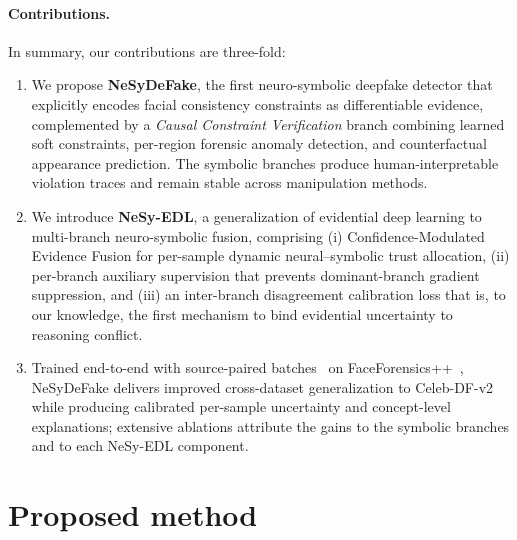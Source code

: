 \documentclass{article}
\begin{document}
\paragraph{Contributions.}
In summary, our contributions are three-fold:
\begin{enumerate}
  \item We propose \textbf{NeSyDeFake}, the first neuro-symbolic deepfake detector that explicitly encodes facial consistency constraints as differentiable evidence, complemented by a \emph{Causal Constraint Verification} branch combining learned soft constraints, per-region forensic anomaly detection, and counterfactual appearance prediction. The symbolic branches produce human-interpretable violation traces and remain stable across manipulation methods.
  \item We introduce \textbf{NeSy-EDL}, a generalization of evidential deep learning to multi-branch neuro-symbolic fusion, comprising (i) Confidence-Modulated Evidence Fusion for per-sample dynamic neural--symbolic trust allocation, (ii) per-branch auxiliary supervision that prevents dominant-branch gradient suppression, and (iii) an inter-branch disagreement calibration loss that is, to our knowledge, the first mechanism to bind evidential uncertainty to reasoning conflict.
  \item Trained end-to-end with source-paired batches~\citep{gend} on FaceForensics++~\citep{rossler2019faceforensics}, NeSyDeFake delivers improved cross-dataset generalization to Celeb-DF-v2~\citep{li2020celeb} while producing calibrated per-sample uncertainty and concept-level explanations; extensive ablations attribute the gains to the symbolic branches and to each NeSy-EDL component.
\end{enumerate}


\section{Proposed method}
\label{sec:method}
\end{document}
